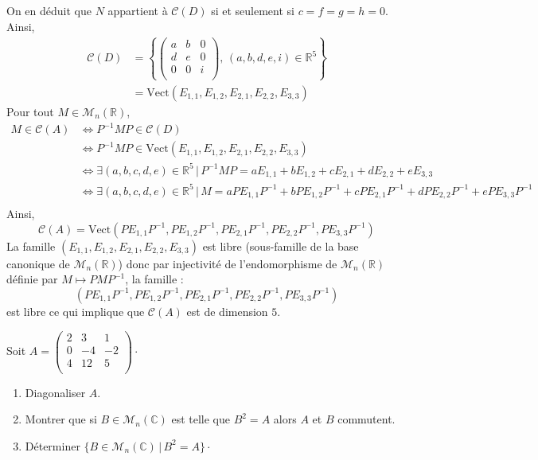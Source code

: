 \documentclass[a4paper,10pt]{report}
\begin{document}
\begin{enumerate}
On en déduit que $N$ appartient à $\mathcal{C}(D)$ si et seulement si $c=f=g=h=0$. Ainsi,
\begin{align*}
\mathcal{C}(D) & = \left\lbrace \begin{pmatrix}
a & b & 0 \\
d & e & 0 \\
0 & 0 & i \\
\end{pmatrix}, \, (a,b,d,e,i) \in \mathbb{R}^5 \right\rbrace \\
& = \textrm{Vect}(E_{1,1}, E_{1,2}, E_{2,1}, E_{2,2},E_{3,3})
\end{align*}
Pour tout $M \in \mathcal{M}_n(\mathbb{R})$,
\begin{align*}
M \in \mathcal{C}(A) & \Longleftrightarrow P^{-1}MP \in \mathcal{C}(D) \\
& \Longleftrightarrow  P^{-1}MP \in \textrm{Vect}(E_{1,1}, E_{1,2}, E_{2,1}, E_{2,2},E_{3,3}) \\
& \Longleftrightarrow \exists (a,b,c,d,e) \in \mathbb{R}^5 \, \vert \, P^{-1}MP = aE_{1,1}+bE_{1,2}+c E_{2,1}+d E_{2,2}+eE_{3,3} \\
& \Longleftrightarrow \exists (a,b,c,d,e) \in \mathbb{R}^5 \, \vert \, M = aPE_{1,1}P^{-1}+bPE_{1,2}P^{-1}+c PE_{2,1}P^{-1}+d PE_{2,2}P^{-1}+ePE_{3,3}P^{-1} \\
\end{align*}
Ainsi,
$$ \mathcal{C}(A) = \textrm{Vect}(PE_{1,1}P^{-1},PE_{1,2}P^{-1},PE_{2,1}P^{-1},PE_{2,2}P^{-1},PE_{3,3}P^{-1}) $$
La famille $(E_{1,1}, E_{1,2}, E_{2,1}, E_{2,2}, E_{3,3})$ est libre (sous-famille de la base canonique de $\mathcal{M}_n(\mathbb{R})$) donc par injectivité de l'endomorphisme de $\mathcal{M}_n(\mathbb{R})$ définie par $M \mapsto PMP^{-1}$, la famille :
$$(PE_{1,1}P^{-1},PE_{1,2}P^{-1},PE_{2,1}P^{-1},PE_{2,2}P^{-1},PE_{3,3}P^{-1})$$
est libre ce qui implique que $\mathcal{C}(A)$ est de dimension $5$.

\end{enumerate}

\begin{Exa} Soit $A= \begin{pmatrix}
2 & 3 & 1 \\
0 & -4 & -2 \\
4 & 12 & 5 \\
\end{pmatrix}\cdot$

\begin{enumerate}
\item Diagonaliser $A$.
\item Montrer que si $B \in \mathcal{M}_n(\mathbb{C})$ est telle que $B^2=A$ alors $A$ et $B$ commutent.
\item Déterminer $\lbrace B \in \mathcal{M}_n(\mathbb{C}) \, \vert \, B^2=A \rbrace \cdot$
\end{enumerate}
\end{Exa}
\end{document}
